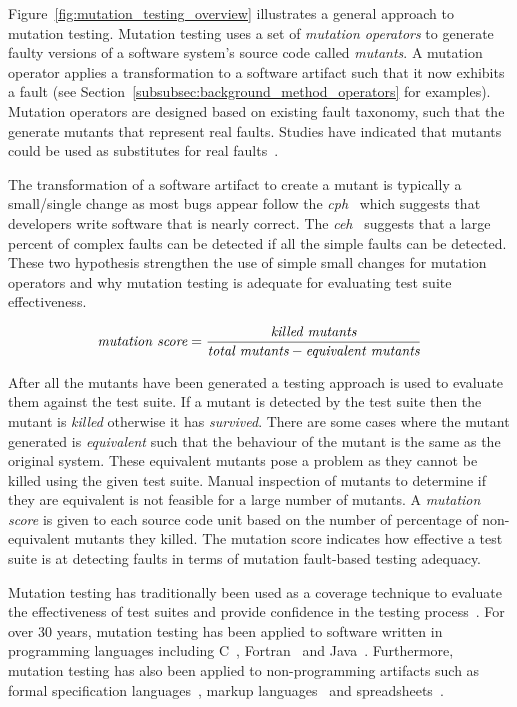 Figure~\ref{fig:mutation_testing_overview} illustrates a general approach to mutation testing. Mutation testing uses a set of \emph{mutation operators} to generate faulty versions of a software system's source code called \emph{mutants}. A mutation operator applies a transformation to a software artifact such that it now exhibits a fault (see Section~\ref{subsubsec:background_method_operators} for examples). Mutation operators are designed based on existing fault taxonomy, such that the generate mutants that represent real faults. Studies have indicated that mutants could be used as substitutes for real faults~\cite{ABLN06, ABL05, NK11}.

The transformation of a software artifact to create a mutant is typically a small/single change as most bugs appear follow the \emph{\gls{cph}}~\cite{ABD+79} which suggests that developers write software that is nearly correct. The \emph{\gls{ceh}}~\cite{Off92} suggests that a large percent of complex faults can be detected if all the simple faults can be detected. These two hypothesis strengthen the use of simple small changes for mutation operators and why mutation testing is adequate for evaluating test suite effectiveness.

\begin{equation}
  \emph{$\text{mutation score} = \frac{\text{killed mutants}}{\text{total mutants} - \text{equivalent mutants}}$}
  \label{equ:mutation_score}
\end{equation}

After all the mutants have been generated a testing approach is used to evaluate them against the test suite. If a mutant is detected by the test suite then the mutant is \emph{killed} otherwise it has \emph{survived}. There are some cases where the mutant generated is \emph{equivalent} such that the behaviour of the mutant is the same as the original system. These equivalent mutants pose a problem as they cannot be killed using the given test suite. Manual inspection of mutants to determine if they are equivalent is not feasible for a large number of mutants. A \emph{mutation score} is given to each source code unit based on the number of percentage of non-equivalent mutants they killed. The mutation score indicates how effective a test suite is at detecting faults in terms of mutation fault-based testing adequacy.

Mutation testing has traditionally been used as a coverage technique to evaluate the effectiveness of test suites and provide confidence in the testing process~\cite{JH10}. For over 30 years, mutation testing has been applied to software written in programming languages including C~\cite{DM96, JH08}, Fortran~\cite{KO91} and Java~\cite{MKO02, BCD06}. Furthermore, mutation testing has also been applied to non-programming artifacts such as formal specification languages~\cite{ABM98}, markup languages~\cite{PO10} and spreadsheets~\cite{AE09}.


